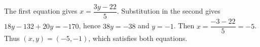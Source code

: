 The first equation gives $x=\dfrac{3y-22}{5}$. Substitution in the second gives $18y-132+20y=-170$, hence $38y=-38$ and $y=-1$. Then $x=\dfrac{-3-22}{5}=-5$. Thus $\boxed{(x,y)=(-5,-1)}$, which satisfies both equations.
